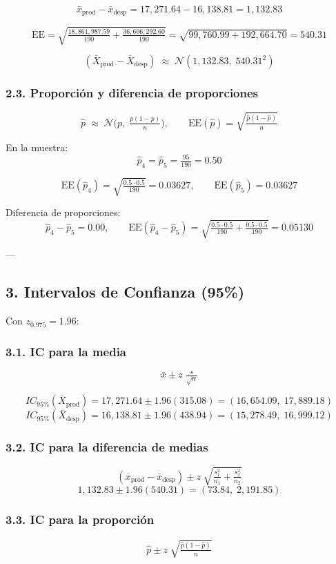 \[
\bar x_{\text{prod}}-\bar x_{\text{desp}}=17{,}271.64-16{,}138.81=1{,}132.83
\]

\[
\text{EE}=\sqrt{\tfrac{18{,}861{,}987.59}{190}+\tfrac{36{,}606{,}292.60}{190}}
=\sqrt{99{,}760.99+192{,}664.70}=540.31
\]

\[
(\bar X_{\text{prod}}-\bar X_{\text{desp}})\;\approx\;\mathcal N(1{,}132.83,\;540.31^2)
\]

\subsubsection*{2.3. Proporción y diferencia de proporciones}
\[
\hat p \;\approx\; \mathcal N\!\Big(p,\;\tfrac{p(1-p)}{n}\Big),
\qquad
\text{EE}(\hat p)=\sqrt{\tfrac{\hat p(1-\hat p)}{n}}
\]

En la muestra:
\[
\hat p_4=\hat p_5=\tfrac{95}{190}=0.50
\]

\[
\text{EE}(\hat p_4)=\sqrt{\tfrac{0.5\cdot 0.5}{190}}=0.03627,
\qquad
\text{EE}(\hat p_5)=0.03627
\]

Diferencia de proporciones:
\[
\hat p_4-\hat p_5=0.00,
\qquad
\text{EE}(\hat p_4-\hat p_5)=\sqrt{\tfrac{0.5\cdot 0.5}{190}+\tfrac{0.5\cdot 0.5}{190}}=0.05130
\]

---

\subsection*{3. Intervalos de Confianza (95\%)}

Con $z_{0.975}=1.96$:

\subsubsection*{3.1. IC para la media}
\[
\bar x \pm z\;\tfrac{s}{\sqrt{n}}
\]

\[
IC_{95\%}(\bar X_{\text{prod}}) = 17{,}271.64 \pm 1.96(315.08) = (16{,}654.09,\;17{,}889.18)
\]
\[
IC_{95\%}(\bar X_{\text{desp}}) = 16{,}138.81 \pm 1.96(438.94) = (15{,}278.49,\;16{,}999.12)
\]

\subsubsection*{3.2. IC para la diferencia de medias}
\[
(\bar x_{\text{prod}}-\bar x_{\text{desp}}) \pm z\;\sqrt{\tfrac{s_1^2}{n_1}+\tfrac{s_2^2}{n_2}}
\]
\[
1{,}132.83 \pm 1.96(540.31) = (73.84,\;2{,}191.85)
\]

\subsubsection*{3.3. IC para la proporción}
\[
\hat p \pm z\;\sqrt{\tfrac{\hat p(1-\hat p)}{n}}
\]

